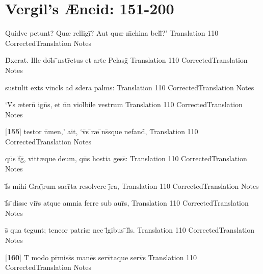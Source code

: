\section{Vergil's {\AE}neid: 151-200} %

\latline
  {Quidve petunt?  Qu{\ae} relligi\={}?  Aut qu{\ae} m\={}china bell\={\macron {\i}}?'}
  { Translation }
  {110}
  { CorrectedTranslation }
  { Notes }


\latline
  {D\={\macron {\i}}xerat.  Ille dol\={\macron {\i}}s \={\macron {\i}}nstr\={}ctus et arte Pelasg\={}}
  { Translation }
  {110}
  { CorrectedTranslation }
  { Notes }


\latline
  {sustulit ex\={}t\={}s vincl\={\macron {\i}}s ad s\={\macron {\i}}dera palm\={}s:}
  { Translation }
  {110}
  { CorrectedTranslation }
  { Notes }


\latline
  {`V\={}s {\ae}tern\={\macron {\i}} ign\={}s, et n\={}n viol\={}bile vestrum}
  { Translation }
  {110}
  { CorrectedTranslation }
  { Notes }


\latline
  {[\textbf{155}] testor n\={}men,' ait, `v\={}s \={}r{\ae} \={}ns\={}sque nefand\={\macron {\i}},}
  { Translation }
  {110}
  { CorrectedTranslation }
  { Notes }


\latline
  {qu\={}s f\={}g\={\macron {\i}}, vitt{\ae}que deum, qu\={}s hostia gess\={\macron {\i}}:}
  { Translation }
  {110}
  { CorrectedTranslation }
  { Notes }


\latline
  {f\={}s mihi Graj\={}rum sacr\={}ta resolvere j\={}ra,}
  { Translation }
  {110}
  { CorrectedTranslation }
  { Notes }


\latline
  {f\={}s \={}disse vir\={}s atque amnia ferre sub aur\={}s,}
  { Translation }
  {110}
  { CorrectedTranslation }
  { Notes }


\latline
  {s\={\macron {\i}} qua tegunt; teneor patri{\ae} nec l\={}gibus \={}ll\={\macron {\i}}s.  }
  { Translation }
  {110}
  { CorrectedTranslation }
  { Notes }


\latline
  {[\textbf{160}] T\={} modo pr\={}miss\={\macron {\i}}s mane\={}s serv\={}taque serv\={}s}
  { Translation }
  {110}
  { CorrectedTranslation }
  { Notes }


